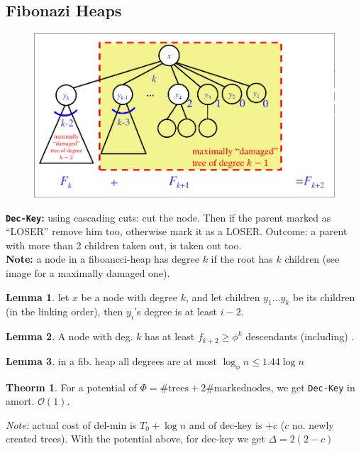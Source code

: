 \documentclass[]{article}
\newcommand\compactsubsection[1]        {\vspace{-10pt}\subsection{#1}\vspace{-5pt}}
\theoremstyle{definition}
\newtheorem{Theorem}{\color{theoColor}Theorm}
\newtheorem{Lemma}{\color{lemColor}Lemma}
\newcommand\theo  [1] {\begin{Theorem}#1\end{Theorem}}
\newcommand\lem   [1] {\begin{Lemma}#1\end{Lemma}}
\newcommand\oc    {\mathcal{O}}
\newcommand\Dg        {\Delta}
\newcommand\logn      {\log n}
\begin{document}
\begin{multicols}{4}
			\compactsubsection{Fibonazi Heaps}
				\begin{figure}
					\includegraphics[width=\linewidth]{images/maxDamageFibonazi}
				\end{figure}
				\textbf{\texttt{Dec-Key}: }using cascading cuts: cut the node. Then if the parent marked as ``LOSER'' remove him too, otherwise mark it as a LOSER. Outcome: a parent with more than 2 children taken out, is taken out too. \\
				\textbf{Note: }a node in a fiboancci-heap has degree $k$ if the root has $k$ children (see image for a maximally damaged one). 
				
				\lem{let $x$ be a node with degree $k$, and let children $y_1 \dots y_k$ be its children (in the linking order), then $y_i$'s degree is at least $i - 2$. }
				\lem{A node with deg. $k$ has at least $f_{k + 2} \ge \phi^{k}$ descendants (including) . }
				\lem{in a fib. heap all degrees are at most $\log_{\phi}n \le 1.44 \log n$}
				\theo{For a potential of $\Phi = \# \mathrm{trees} + 2\# \mathrm{marked nodes}$, we get \texttt{Dec-Key} in amort. $\oc(1)$. }
				\textit{Note: }actual cost of del-min is $T_0 + \logn$ and of dec-key is $+c$ ($c$ no. newly created trees). With the potential above, for dec-key we get $\Dg = 2(2 - c)$
		

\end{multicols}
\end{document}
